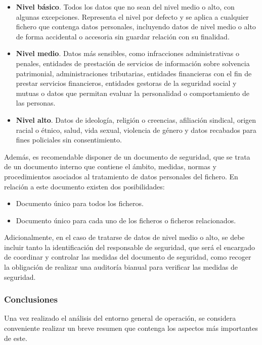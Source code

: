 \begin{itemize}
    \item \textbf{Nivel básico}. Todos los datos que no sean del nivel medio o alto, con algunas excepciones. Representa el nivel por defecto y se aplica a cualquier fichero que contenga datos personales, incluyendo datos de nivel medio o alto de forma accidental o accesoria sin guardar relación con su finalidad.
    
    \clearpage
    
    \item \textbf{Nivel medio}. Datos más sensibles, como infracciones administrativas o penales, entidades de prestación de servicios de información sobre solvencia patrimonial, administraciones tributarias, entidades financieras con el fin de prestar servicios financieros, entidades gestoras de la seguridad social y mutuas o datos que permitan evaluar la personalidad o comportamiento de las personas.
    
    \item \textbf{Nivel alto}. Datos de ideología, religión o creencias, afiliación sindical, origen racial o étnico, salud, vida sexual, violencia de género y datos recabados para fines policiales sin consentimiento.
\end{itemize}

Además, es recomendable disponer de un documento de seguridad, que se trata de un documento interno que contiene el ámbito, medidas, normas y procedimientos asociados al tratamiento de datos personales del fichero. En relación a este documento existen dos posibilidades:

\begin{itemize}
    \item Documento único para todos los ficheros.
    \item Documento único para cada uno de los ficheros o ficheros relacionados.
\end{itemize}

Adicionalmente, en el caso de tratarse de datos de nivel medio o alto, se debe incluir tanto la identificación del responsable de seguridad, que será el encargado de coordinar y controlar las medidas del documento de seguridad, como recoger la obligación de realizar una auditoría bianual para verificar las medidas de seguridad.

\clearpage

\subsubsection{Conclusiones}
Una vez realizado el análisis del entorno general de operación, se considera conveniente realizar un breve resumen que contenga los aspectos más importantes de este.

